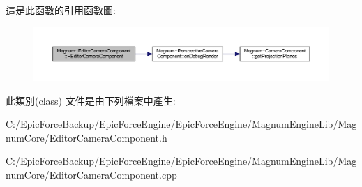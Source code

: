 這是此函數的引用函數圖\+:\nopagebreak
\begin{figure}[H]
\begin{center}
\leavevmode
\includegraphics[width=350pt]{class_magnum_1_1_editor_camera_component_a25a0c9cdfa8ba1bb7aef1fc69435ab9f_cgraph}
\end{center}
\end{figure}




此類別(class) 文件是由下列檔案中產生\+:\begin{DoxyCompactItemize}
\item 
C\+:/\+Epic\+Force\+Backup/\+Epic\+Force\+Engine/\+Epic\+Force\+Engine/\+Magnum\+Engine\+Lib/\+Magnum\+Core/Editor\+Camera\+Component.\+h\item 
C\+:/\+Epic\+Force\+Backup/\+Epic\+Force\+Engine/\+Epic\+Force\+Engine/\+Magnum\+Engine\+Lib/\+Magnum\+Core/Editor\+Camera\+Component.\+cpp\end{DoxyCompactItemize}
